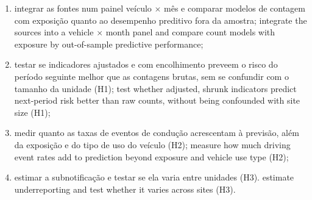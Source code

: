 \documentclass[12pt,a4paper]{article}
\begin{document}
\begin{enumerate}[label=\alph*)]
  \item \tr%
    {integrar as fontes num painel veículo $\times$ mês e comparar modelos de contagem com exposição quanto ao desempenho preditivo fora da amostra;}%
    {integrate the sources into a vehicle $\times$ month panel and compare count models with exposure by out-of-sample predictive performance;}
  \item \tr%
    {testar se indicadores ajustados e com encolhimento preveem o risco do período seguinte melhor que as contagens brutas, sem se confundir com o tamanho da unidade (H1);}%
    {test whether adjusted, shrunk indicators predict next-period risk better than raw counts, without being confounded with site size (H1);}
  \item \tr%
    {medir quanto as taxas de eventos de condução acrescentam à previsão, além da exposição e do tipo de uso do veículo (H2);}%
    {measure how much driving event rates add to prediction beyond exposure and vehicle use type (H2);}
  \item \tr%
    {estimar a subnotificação e testar se ela varia entre unidades (H3).}%
    {estimate underreporting and test whether it varies across sites (H3).}
\end{enumerate}

\section{}


\subsection{}
\end{document}
